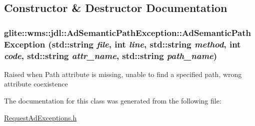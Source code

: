 \subsection{Constructor \& Destructor Documentation}
\hypertarget{classglite_1_1wms_1_1jdl_1_1AdSemanticPathException_a0}{
\subsubsection[AdSemanticPathException]{\setlength{\rightskip}{0pt plus 5cm}glite::wms::jdl::Ad\-Semantic\-Path\-Exception::Ad\-Semantic\-Path\-Exception (std::string {\em file}, int {\em line}, std::string {\em method}, int {\em code}, std::string {\em attr\_\-name}, std::string {\em path\_\-name})}}
\label{classglite_1_1wms_1_1jdl_1_1AdSemanticPathException_a0}


Raised when Path attribute is missing, unable to find a specified path, wrong attribute coexistence 

The documentation for this class was generated from the following file:\begin{CompactItemize}
\item 
\hyperlink{RequestAdExceptions_8h}{Request\-Ad\-Exceptions.h}\end{CompactItemize}
